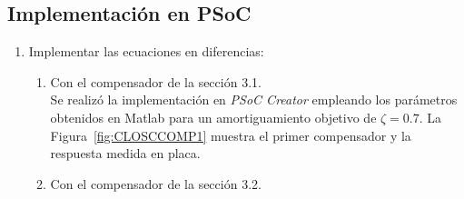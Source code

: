 \subsection{Implementación en PSoC}
\begin{enumerate}[label=4.\arabic*.]
	\item Implementar las ecuaciones en diferencias:
	\begin{enumerate}[label*=4.\arabic*.]
			\item Con el compensador de la sección 3.1.\\
			Se realizó la implementación en \textit{PSoC Creator} empleando los parámetros obtenidos en Matlab para un amortiguamiento objetivo de $\zeta = 0.7$. La Figura~\ref{fig:CLOSCCOMP1} muestra el primer compensador y la respuesta medida en placa.
			
			
			
			
			\item Con el compensador de la sección 3.2.
			
			
			
			
		\end{enumerate}
\end{enumerate}
